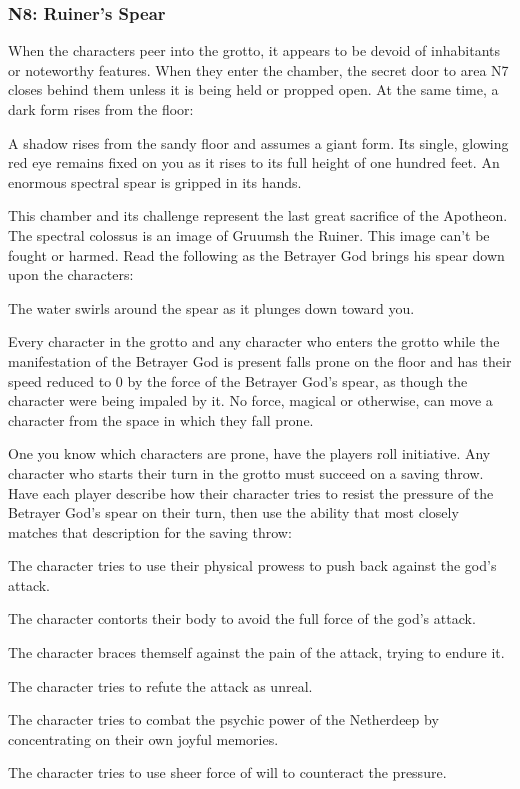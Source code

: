 \documentclass[10pt,a4paper,twoside,bg=print,twocolumn,openany,nodeprecatedcode]{dndbook}
\begin{document}
\subsubsection{N8: Ruiner's Spear}
When the characters peer into the grotto, it appears to be devoid of inhabitants or noteworthy features. When they enter the chamber, the secret door to area N7 closes behind them unless it is being held or propped open. At the same time, a dark form rises from the floor:

\begin{DndReadAloud}{}
A shadow rises from the sandy floor and assumes a giant form. Its single, glowing red eye remains fixed on you as it rises to its full height of one hundred feet. An enormous spectral spear is gripped in its hands.

\end{DndReadAloud}

This chamber and its challenge represent the last great sacrifice of the Apotheon. The spectral colossus is an image of Gruumsh the Ruiner. This image can't be fought or harmed. Read the following as the Betrayer God brings his spear down upon the characters:

\begin{DndReadAloud}{}
The water swirls around the spear as it plunges down toward you.

\end{DndReadAloud}

Every character in the grotto and any character who enters the grotto while the manifestation of the Betrayer God is present falls prone on the floor and has their speed reduced to 0 by the force of the Betrayer God's spear, as though the character were being impaled by it. No force, magical or otherwise, can move a character from the space in which they fall prone.

One you know which characters are prone, have the players roll initiative. Any character who starts their turn in the grotto must succeed on a saving throw. Have each player describe how their character tries to resist the pressure of the Betrayer God's spear on their turn, then use the ability that most closely matches that description for the saving throw:


\begin{description}[nolistsep]
\item[Strength.]
The character tries to use their physical prowess to push back against the god's attack.
\item[Dexterity.]
The character contorts their body to avoid the full force of the god's attack.
\item[Constitution.]
The character braces themself against the pain of the attack, trying to endure it.
\item[Intelligence.]
The character tries to refute the attack as unreal.
\item[Wisdom.]
The character tries to combat the psychic power of the Netherdeep by concentrating on their own joyful memories.
\item[Charisma.]
The character tries to use sheer force of will to counteract the pressure.
\end{description}
\end{document}
